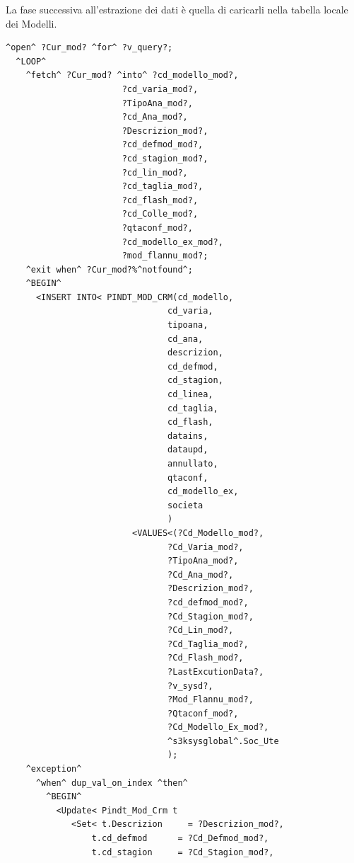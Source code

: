 La fase successiva all'estrazione dei dati è quella di caricarli nella tabella locale dei Modelli.
\begin{lstlisting}[frame=single,style=base]
^open^ ?Cur_mod? ^for^ ?v_query?;
  ^LOOP^
    ^fetch^ ?Cur_mod? ^into^ ?cd_modello_mod?,
                       ?cd_varia_mod?,
                       ?TipoAna_mod?,
                       ?cd_Ana_mod?,
                       ?Descrizion_mod?,
                       ?cd_defmod_mod?,
                       ?cd_stagion_mod?,
                       ?cd_lin_mod?,
                       ?cd_taglia_mod?,
                       ?cd_flash_mod?,
                       ?cd_Colle_mod?,
                       ?qtaconf_mod?,
                       ?cd_modello_ex_mod?,
                       ?mod_flannu_mod?;
    ^exit when^ ?Cur_mod?%^notfound^;
    ^BEGIN^
      <INSERT INTO< PINDT_MOD_CRM(cd_modello,
                                cd_varia,
                                tipoana,
                                cd_ana,
                                descrizion,
                                cd_defmod,
                                cd_stagion,
                                cd_linea,
                                cd_taglia,
                                cd_flash,
                                datains,
                                dataupd,
                                annullato,
                                qtaconf,
                                cd_modello_ex,
                                societa
                                )
                         <VALUES<(?Cd_Modello_mod?,
                                ?Cd_Varia_mod?,
                                ?TipoAna_mod?,
                                ?Cd_Ana_mod?,
                                ?Descrizion_mod?,
                                ?cd_defmod_mod?,
                                ?Cd_Stagion_mod?,
                                ?Cd_Lin_mod?,
                                ?Cd_Taglia_mod?,
                                ?Cd_Flash_mod?,
                                ?LastExcutionData?,
                                ?v_sysd?,
                                ?Mod_Flannu_mod?,
                                ?Qtaconf_mod?,
                                ?Cd_Modello_Ex_mod?,
                                ^s3ksysglobal^.Soc_Ute
                                );
    ^exception^
      ^when^ dup_val_on_index ^then^
        ^BEGIN^
          <Update< Pindt_Mod_Crm t 
             <Set< t.Descrizion     = ?Descrizion_mod?,
                 t.cd_defmod      = ?Cd_Defmod_mod?,
                 t.cd_stagion     = ?Cd_Stagion_mod?,

\end{lstlisting}
